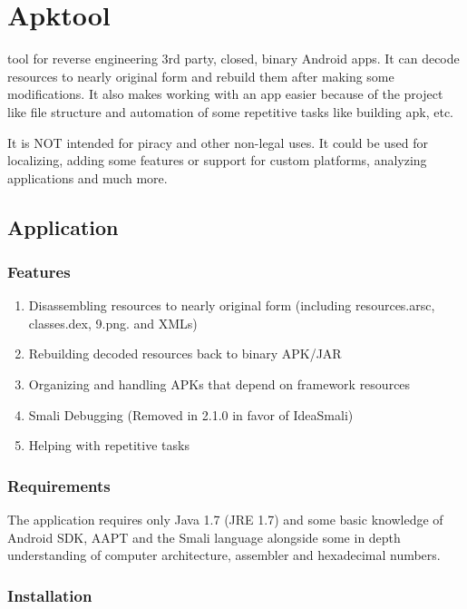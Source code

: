 %
%
\let\textcircled=\pgftextcircled
\chapter{Apktool}
\label{chap:apktool}

 tool for reverse engineering 3rd party, closed, binary Android apps. It can decode resources to nearly original form and rebuild them after making some modifications. It also makes working with an app easier because of the project like file structure and automation of some repetitive tasks like building apk, etc.

It is NOT intended for piracy and other non-legal uses. It could be used for localizing, adding some features or support for custom platforms, analyzing applications and much more.

\section{Application}
\label{sec:sec0201}

\subsection{Features}
\begin{enumerate}
\item{Disassembling resources to nearly original form (including resources.arsc, classes.dex, 9.png. and XMLs)}
\item{Rebuilding decoded resources back to binary APK/JAR}
\item{Organizing and handling APKs that depend on framework resources}
\item{Smali Debugging (Removed in 2.1.0 in favor of IdeaSmali)}
\item{Helping with repetitive tasks}
\end{enumerate}


\subsection{Requirements}

The application requires only Java 1.7 (JRE 1.7) and some basic knowledge of Android SDK, AAPT and the Smali language alongside some in depth understanding of computer architecture, assembler and hexadecimal numbers.

\subsection{Installation}

